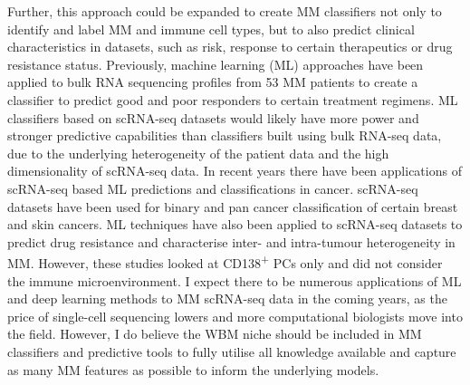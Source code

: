 Further, this approach could be expanded to create MM classifiers not only to identify and label MM and immune cell types, but to also predict clinical characteristics in datasets, such as risk, response to certain therapeutics or drug resistance status.
Previously, machine learning (ML) approaches have been applied to bulk RNA sequencing profiles from 53 MM patients to create a classifier to predict good and poor responders to certain treatment regimens\cite{borisov2021machine}.
ML classifiers based on scRNA-seq datasets would likely have more power and stronger predictive capabilities than classifiers built using bulk RNA-seq data, due to the underlying heterogeneity of the patient data and the high dimensionality of scRNA-seq data.
In recent years there have been applications of scRNA-seq based ML predictions and classifications in cancer.
scRNA-seq datasets have been used for binary and pan cancer classification of certain breast and skin cancers\cite{mahin2022panclassif}.
ML techniques have also been applied to scRNA-seq datasets to predict drug resistance and characterise inter- and intra-tumour heterogeneity in MM\cite{kashif2021predicting, johnson2019development}.
However, these studies looked at CD138\textsuperscript{+} PCs only and did not consider the immune microenvironment.
I expect there to be numerous applications of ML and deep learning methods to MM scRNA-seq data in the coming years, as the price of single-cell sequencing lowers and more computational biologists move into the field.
However, I do believe the WBM niche should be included in MM classifiers and predictive tools to fully utilise all knowledge available and capture as many MM features as possible to inform the underlying models.
